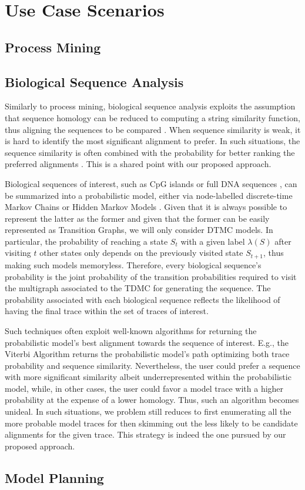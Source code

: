 \section{Use Case Scenarios}
\subsection{Process Mining}
\subsection{Biological Sequence Analysis}
Similarly to process mining, biological sequence analysis exploits the assumption that sequence homology can be reduced to computing a string similarity function, thus aligning the sequences to be compared \cite{durbin1998biological}. When sequence similarity is weak, it is hard to identify the most significant alignment to prefer. In such situations, the sequence similarity is often combined with the probability for better ranking the preferred alignments \cite{durbin1998biological}. This is a shared point with our proposed approach. 

Biological sequences of interest, such as CpG islands \cite{kxq005} or full DNA sequences \cite{BISHOP1986159}, can be summarized into a probabilistic model, either via node-labelled discrete-time Markov Chains \cite{RyabkoU08} or Hidden Markov Models \cite{Helske2018}. Given that it is always possible to represent the latter as the former \cite{DUPONT20051349} and given that the former can be easily represented as Transition Graphs, we will only consider DTMC models. In particular, the probability of reaching a state $S_t$ with a given label $\lambda(S)$ after visiting $t$ other states only depends on the previously visited state $S_{t+1}$, thus making such models memoryless. Therefore, every biological sequence's probability is the joint probability of the transition probabilities required to visit the multigraph associated to the TDMC for generating the sequence. The probability associated with each biological sequence reflects the likelihood of having the final trace within the set of traces of interest. 

Such techniques often exploit well-known algorithms for returning the probabilistic model's best alignment towards the sequence of interest. E.g., the Viterbi Algorithm \cite{Viterbi67} returns the probabilistic model's path optimizing both trace probability and sequence similarity.  Nevertheless, the user could prefer a sequence with more significant similarity albeit underrepresented within the probabilistic model, while, in other cases, the user could favor a model trace with a higher probability at the expense of a lower homology. Thus, such an algorithm becomes unideal. In such situations, we problem still reduces to first enumerating all the more probable model traces for then skimming out the less likely to be candidate alignments for the given trace. This strategy is indeed the one pursued by our proposed approach. 


\subsection{Model Planning}